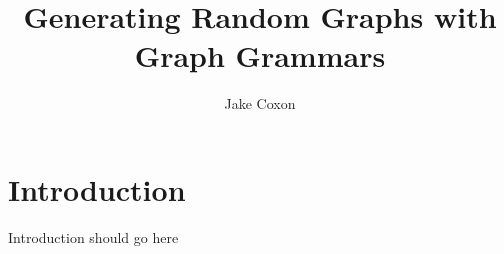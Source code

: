 \documentclass{article}
\begin{document}
\title{Generating Random Graphs with Graph Grammars}
\author{Jake Coxon}
\maketitle

\tableofcontents

\section{Introduction}
Introduction should go here




    
{}

\end{document}

